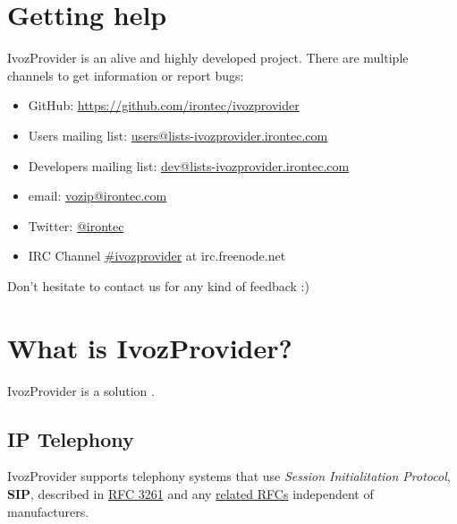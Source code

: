 \documentclass[letterpaper,10pt,english]{sphinxmanual}
\begin{document}
\section{Getting help}
\label{intro/getting_help:getting-help}\label{intro/getting_help::doc}\label{intro/getting_help:id1}
IvozProvider is an alive and highly developed project. There are
multiple channels to get information or report bugs:
\begin{itemize}
\item {} 
GitHub: \url{https://github.com/irontec/ivozprovider}

\item {} 
Users mailing list: \href{mailto:users@lists-ivozprovider.irontec.com}{users@lists-ivozprovider.irontec.com}

\item {} 
Developers mailing list: \href{mailto:dev@lists-ivozprovider.irontec.com}{dev@lists-ivozprovider.irontec.com}

\item {} 
email: \href{mailto:vozip@irontec.com}{vozip@irontec.com}

\item {} 
Twitter: \href{https://twitter.com/irontec}{@irontec}

\item {} 
IRC Channel \href{https://webchat.freenode.net/?channels=ivozprovider}{\#ivozprovider} at irc.freenode.net

\end{itemize}

Don't hesitate to contact us for any kind of feedback :)


\section{What is IvozProvider?}
\label{intro/what_is_ivozprovider::doc}\label{intro/what_is_ivozprovider:what-is-ivozprovider}
IvozProvider is a {\hyperref[intro/what_is_ivozprovider:operator\string-oriented]{}}
{\hyperref[intro/what_is_ivozprovider:multilevel]{}} {\hyperref[intro/what_is_ivozprovider:voip]{}} solution
{\hyperref[intro/what_is_ivozprovider:exposed]{}}.


\subsection{IP Telephony}
\label{intro/what_is_ivozprovider:ip-telephony}\label{intro/what_is_ivozprovider:voip}
IvozProvider supports telephony systems that use \emph{Session Initialitation
Protocol}, \textbf{SIP}, described in \href{https://tools.ietf.org/html/rfc3261}{RFC 3261} and any \href{https://www.packetizer.com/ipmc/sip/standards.html}{related RFCs} independent of
manufacturers.
\end{document}

